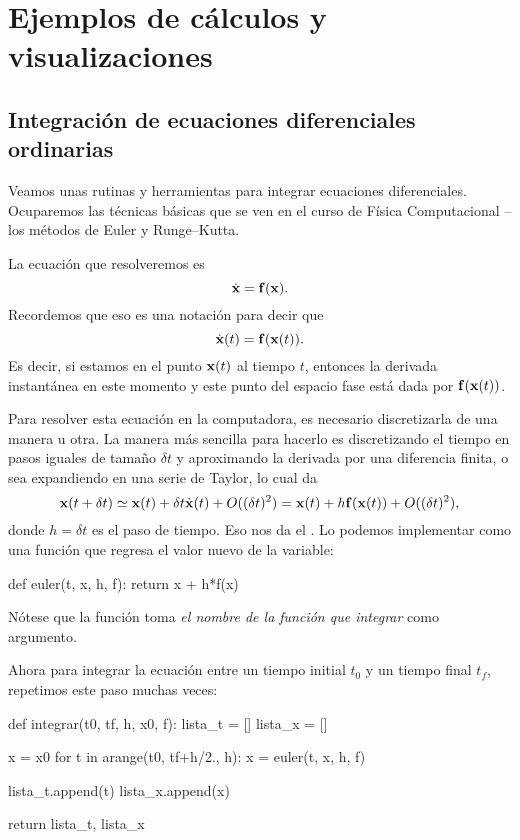 \chapter{Ejemplos de cálculos y visualizaciones}

\section{Integración de ecuaciones diferenciales ordinarias}

Veamos unas rutinas y herramientas para integrar ecuaciones diferenciales. Ocuparemos las técnicas básicas  que se ven en el curso de Física Computacional --los métodos de Euler y Runge--Kutta.

La ecuación que resolveremos es
\begin{equation}
\dot{\mathbf{x}} = \mathbf{f}(\mathbf{x}).
\end{equation}
Recordemos que eso es una notación para decir que
\begin{equation}
\dot{\mathbf{x}}(t) = \mathbf{f}(\mathbf{x}(t)).
\end{equation}
Es decir, si estamos en el punto $\mathbf{x}(t)$ al tiempo $t$, entonces la derivada instantánea en este momento y este punto del espacio fase está dada por $\mathbf{f}(\mathbf{x}(t))$.

Para resolver esta ecuación en la computadora, es necesario discretizarla de una manera u otra.
La manera más sencilla para hacerlo es discretizando el tiempo en pasos iguales de tamaño $\delta t$ y aproximando la derivada por una diferencia finita, o sea expandiendo en una serie de Taylor, lo cual da
\begin{equation}
 \mathbf{x}(t+\delta t) \simeq \mathbf{x}(t) + \delta t \dot{\mathbf{x}}(t) + O( (\delta t) ^2) = \mathbf{x}(t) + h \mathbf{f}(\mathbf{x}(t)) + O( (\delta t) ^2),
\end{equation}
donde $h = \delta t$ es el paso de tiempo.
Eso nos da el . Lo podemos implementar como una función que regresa el valor nuevo de la variable:
\begin{python}
def euler(t, x, h, f):
  return x + h*f(x)
\end{python}
Nótese que la función  toma \emph{el nombre de la función  que integrar} como argumento.

Ahora para integrar la ecuación entre un tiempo initial $t_0$ y un tiempo final $t_f$, repetimos este paso muchas veces:
\begin{python}
def integrar(t0, tf, h, x0, f):
  lista_t = []
  lista_x = []
  
  x = x0
  for t in arange(t0, tf+h/2., h):
    x = euler(t, x, h, f)
    
    lista_t.append(t)
    lista_x.append(x)
    
  return lista_t, lista_x
\end{python}

